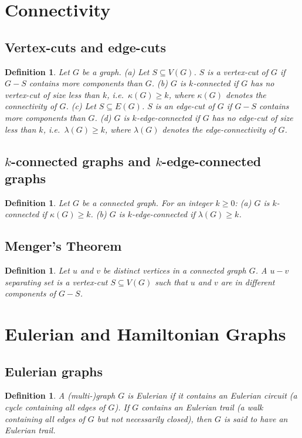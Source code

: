 \documentclass[11pt]{article}
\newtheorem{definition}[theorem]{Definition}
\begin{document}
\section{Connectivity}
\subsection{Vertex-cuts and edge-cuts}
\begin{definition}
Let $G$ be a graph. 
(a) Let $S\subseteq V(G)$. $S$ is a vertex-cut of $G$ if $G-S$ contains more components than $G$. 
(b) $G$ is $k$-connected if $G$ has no vertex-cut of size less than $k$, i.e.\ $\kappa(G)\ge k$, where $\kappa(G)$ denotes the connectivity of $G$. 
(c) Let $S\subseteq E(G)$. $S$ is an edge-cut of $G$ if $G-S$ contains more components than $G$. 
(d) $G$ is $k$-edge-connected if $G$ has no edge-cut of size less than $k$, i.e.\ $\lambda(G)\ge k$, where $\lambda(G)$ denotes the edge-connectivity of $G$.
\end{definition}
\subsection{$k$-connected graphs and $k$-edge-connected graphs}
\begin{definition}
Let $G$ be a connected graph. For an integer $k\ge 0$: 
(a) $G$ is $k$-connected if $\kappa(G)\ge k$. 
(b) $G$ is $k$-edge-connected if $\lambda(G)\ge k$.
\end{definition}
\subsection{Menger's Theorem}
\begin{definition}
Let $u$ and $v$ be distinct vertices in a connected graph $G$. A $u\!-\!v$ separating set is a vertex-cut $S\subseteq V(G)$ such that $u$ and $v$ are in different components of $G - S$.
\end{definition}
\section{Eulerian and Hamiltonian Graphs}
\subsection{Eulerian graphs}
\begin{definition}
A (multi-)graph $G$ is Eulerian if it contains an Eulerian circuit (a cycle containing all edges of $G$). If $G$ contains an Eulerian trail (a walk containing all edges of $G$ but not necessarily closed), then $G$ is said to have an Eulerian trail.
\end{definition}
\end{document}
